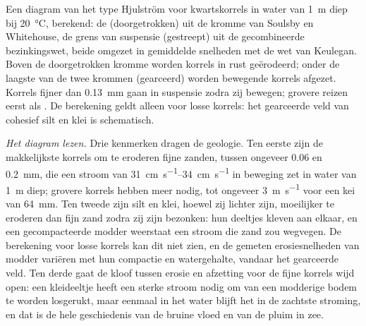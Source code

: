 \begin{omfigure}
{\small Een diagram van het type Hjulström voor kwartskorrels in water van \qty{1}{m} diep bij \qty{20}{\celsius}, berekend: de  (doorgetrokken) uit de kromme van Soulsby en Whitehouse, de grens van suspensie (gestreept) uit de gecombineerde bezinkingswet, beide omgezet in gemiddelde snelheden met de wet van Keulegan. Boven de doorgetrokken kromme worden korrels in rust geërodeerd; onder de laagste van de twee krommen (gearceerd) worden bewegende korrels afgezet. Korrels fijner dan \qty{0.13}{mm} gaan in suspensie zodra zij bewegen; grovere reizen eerst als . De berekening geldt alleen voor losse korrels: het gearceerde veld van cohesief silt en klei is schematisch.}
\label{fig:b1:erosion-transport:hjulstrom}
\end{omfigure}

\emph{Het diagram lezen.} Drie kenmerken dragen de geologie. Ten eerste zijn de makkelijkste korrels om te eroderen fijne zanden, tussen ongeveer \num{0.06} en \qty{0.2}{mm}, die een stroom van \qtyrange{31}{34}{cm.s^{-1}} in beweging zet in water van \qty{1}{m} diep; grovere korrels hebben meer nodig, tot ongeveer \qty{3}{m.s^{-1}} voor een kei van \qty{64}{mm}. Ten tweede zijn silt en klei, hoewel zij lichter zijn, moeilijker te eroderen dan fijn zand zodra zij zijn bezonken: hun deeltjes kleven aan elkaar, en een gecompacteerde modder weerstaat een stroom die zand zou wegvegen. De berekening voor losse korrels kan dit niet zien, en de gemeten erosiesnelheden van modder variëren met hun compactie en watergehalte, vandaar het gearceerde veld. Ten derde gaat de kloof tussen erosie en afzetting voor de fijne korrels wijd open: een kleideeltje heeft een sterke stroom nodig om van een modderige bodem te worden losgerukt, maar eenmaal in het water blijft het in de zachtste stroming, en dat is de hele geschiedenis van de bruine vloed en van de pluim in zee.

